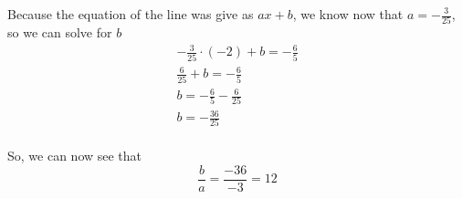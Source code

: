 \documentclass[11pt]{article}
\begin{document}
Because the equation of the line was give as $ax+b$, we know now that $a = -\frac{3}{25}$, so we can solve for $b$
\begin{gather*}
  -\frac{3}{25} \cdot (-2) + b = -\frac{6}{5} \\
  \frac{6}{25}+b = -\frac{6}{5} \\
  b= -\frac{6}{5} - \frac{6}{25} \\
  b = -\frac{36}{25} \\
\end{gather*}

So, we can now see that
\[
  \frac{b}{a} = \frac{-36}{-3} = 12
\]
\end{document}
